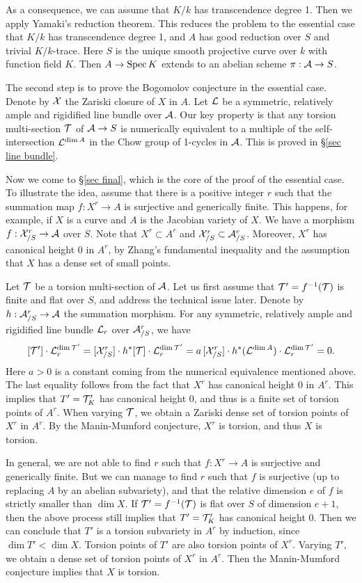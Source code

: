 \documentclass[12pt]{amsart}
\begin{document}
As a consequence, we can assume that $K/k$ has transcendence degree 1. 
Then we apply Yamaki's reduction theorem. 
This reduces the problem to the essential case that $K/k$ has transcendence degree 1, 
and $A$ has good reduction over $S$ and trivial $K/k$-trace. 
Here $S$ is the unique smooth projective curve over $k$ with function field $K$.
Then $A\to {\rm Spec \,} K$ extends to an abelian scheme $\pi:{\mathcal A}\to S$. 


The second step is to prove the Bogomolov conjecture in the essential case. 
Denote by ${\mathcal X}$ the Zariski closure of $X$ in $A$.
Let ${\mathcal L}$ be a symmetric, relatively ample and rigidified line bundle over ${\mathcal A}$.
Our key property is that any torsion multi-section ${\mathcal T}$ of ${\mathcal A}\to S$ is numerically equivalent to a multiple of the self-intersection ${\mathcal L}^{\dim A}$ in the Chow group of 1-cycles in ${\mathcal A}$.
This is proved in \S\ref{sec line bundle}.

Now we come to \S\ref{sec final}, which is the core of the proof of the essential case.
To illustrate the idea, assume that there is a positive integer $r$ such that the summation map $f:X^r\to A$ is surjective and generically finite. This happens, for example, if $X$ is a curve and $A$ is the Jacobian variety of $X$.
We have a morphism $f:{\mathcal X}_{/S}^r\to {\mathcal A}$ over $S$. 
Note that $X^r\subset A^r$ and ${\mathcal X}_{/S}^r\subset {\mathcal A}_{/S}^r$.
Moreover, $X^r$ has canonical height 0 in $A^r$, by Zhang's fundamental inequality and the assumption that $X$ has a dense set of small points. 

Let ${\mathcal T}$ be a torsion multi-section of ${\mathcal A}$. 
Let us first assume that ${\mathcal T}'=f^{-1}({\mathcal T})$ is finite and flat over $S$, and address the technical issue later. 
Denote by $h:{\mathcal A}_{/S}^r\to {\mathcal A}$ the summation morphism. 
For any symmetric, relatively ample and rigidified line bundle 
${\mathcal L}_r$ over ${\mathcal A}_{/S}^r$, we have
$$
[{\mathcal T}']\cdot {\mathcal L}_r^{\dim {\mathcal T}'}=[{\mathcal X}_{/S}^r] \cdot h^*[{\mathcal T}]\cdot {\mathcal L}_r^{\dim {\mathcal T}'}
=a\, [{\mathcal X}_{/S}^r] \cdot h^*({\mathcal L}^{\dim A})\cdot {\mathcal L}_r^{\dim {\mathcal T}'}
=0.
$$
Here $a>0$ is a constant coming from the numerical equivalence mentioned above. 
The last equality follows from the fact that $X^r$ has canonical height 0 in $A^r$.
This implies that $T'={\mathcal T}'_K$ has canonical height 0, and thus is a finite set of torsion points of $A^r$. 
When varying ${\mathcal T}$, we obtain a Zariski dense set of torsion points of $X^r$ in $A^r$. 
By the Manin-Mumford conjecture, $X^r$ is torsion, and thus $X$ is torsion. 

In general, we are not able to find $r$ such that $f:X^r\to A$ is surjective and generically finite.
But we can manage to find $r$ such that $f$ is surjective (up to replacing $A$ by an abelian subvariety), and that the relative dimension $e$ of $f$ is strictly smaller than $\dim X$.
If ${\mathcal T}'=f^{-1}({\mathcal T})$ is flat over $S$ of dimension $e+1$, then the above process still implies that $T'={\mathcal T}'_K$ has canonical height 0. 
Then we can conclude that $T'$ is a torsion subvariety in $A^r$ by induction, since $\dim T'<\dim X$.
Torsion points of $T'$ are also torsion points of $X^r$. 
Varying $T'$, we obtain a dense set of torsion points of $X^r$ in $A^r$. 
Then the Manin-Mumford conjecture implies that $X$ is torsion. 
\end{document}
